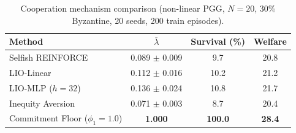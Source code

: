 \begin{table}[h]
\centering
\caption{Cooperation mechanism comparison (non-linear PGG, $N{=}20$, 30\% Byzantine, 20 seeds, 200 train episodes).}
\label{tab:mechanism_comparison}
\small
\begin{tabular}{@{}lccc@{}}
\toprule
Method & $\bar\lambda$ & Survival (\%) & Welfare \\
\midrule
Selfish REINFORCE & 0.089 $\pm$ 0.009 & 9.7 & 20.8 \\
LIO-Linear \citep{yang2020learning} & 0.112 $\pm$ 0.016 & 10.2 & 21.2 \\
LIO-MLP ($h{=}32$) & 0.136 $\pm$ 0.024 & 10.8 & 21.7 \\
Inequity Aversion \citep{hughes2018inequity} & 0.071 $\pm$ 0.003 & 8.7 & 20.4 \\
\midrule
Commitment Floor ($\phi_1{=}1.0$) & \textbf{1.000} & \textbf{100.0} & \textbf{28.4} \\
\bottomrule
\end{tabular}
\end{table}

